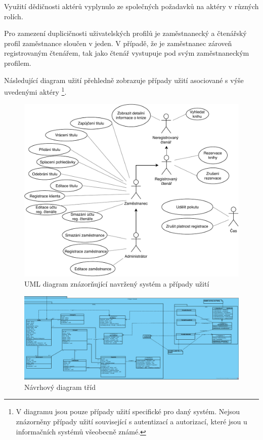 \documentclass[11pt, a4paper, titlepage]{article}
\begin{document}
	\noindent Využití dědičnosti aktérů vyplynulo ze společných požadavků na aktéry v různých
	rolích.

	Pro zamezení duplicičnosti uživatelských profilů je zaměstnanecký a čtenářský profil 
	zaměstnance sloučen v jeden. V případě, že je zaměstnanec zároveň registrovaným čtenářem,
	tak jako čtenář vystupuje pod svým zaměstnaneckým profilem.

	\newpage

	Následující diagram užití přehledně zobrazuje případy užití asociované s výše uvedenými aktéry	
	\footnote{V diagramu jsou pouze případy užití specifické pro daný systém. Nejsou znázorněny
	případy užití související s autentizací a autorizací, které jsou u informačních systémů
	všeobecně známé.}.
	
	\begin{figure}[H]
		
		\centering
		\includegraphics[width=1.0\textwidth, angle=0]{./assets/usecase/full.pdf}
		\caption{UML diagram znázorňující navržený systém a případy užití}

	\end{figure}

	\begin{figure}[H]
		\centering
        \includegraphics[width=1.5\textwidth, angle =90]{./assets/classdiagram/pis.png}
		\caption{Návrhový diagram tříd}
	\end{figure}
\end{document}
